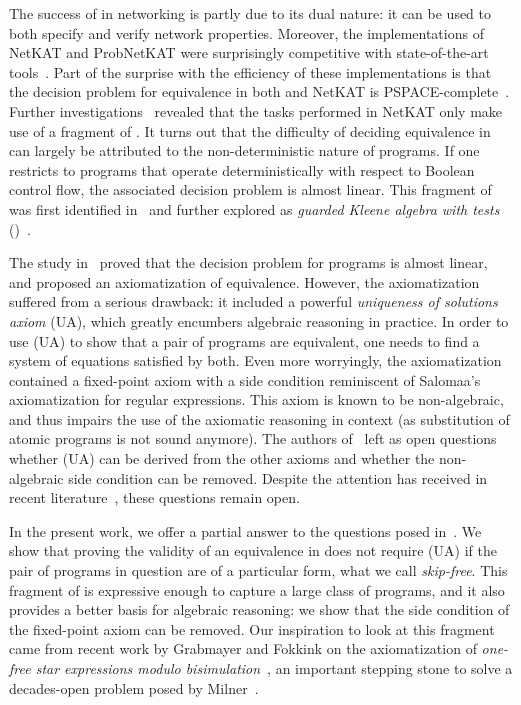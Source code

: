 \documentclass[orivec,envcountsect,envcountsame]{llncs}
\begin{document}
    The success of \KAT in networking is partly due to its dual nature: it can be used to both specify and verify network properties.
    Moreover, the implementations of {\sffamily NetKAT} and {\sffamily ProbNetKAT} were surprisingly competitive with state-of-the-art tools~\cite{netkat-decision,mcnetkat}.
    Part of the surprise with the efficiency of these implementations is that the decision problem for equivalence in both \KAT and {\sffamily NetKAT} is PSPACE-complete~\cite{katcompleteness,netkat}.
    Further investigations~\cite{gkatpopl} revealed that the tasks performed in {\sffamily NetKAT} only make use of a fragment of \KAT. %
    It turns out that the difficulty of deciding equivalence in \KAT can largely be attributed to the non-deterministic nature of \KAT programs.
    If one restricts to \KAT programs that operate deterministically with respect to Boolean control flow, the associated decision problem is almost linear.
    This fragment of \KAT was first identified in~\cite{kozentseng} and further explored as \emph{guarded Kleene algebra with tests} (\GKAT)~\cite{gkatpopl}.

    The study in~\cite{gkatpopl} proved that the decision problem for \GKAT programs is almost linear, and proposed an axiomatization of equivalence.
    However, the axiomatization suffered from a serious drawback: it included a powerful \emph{uniqueness of solutions axiom} (\textsf{UA}), which greatly encumbers algebraic reasoning in practice.
    In order to use (\textsf{UA}) to show that a pair of programs are equivalent, one needs to find a system of equations satisfied by both.
    Even more worryingly, the axiomatization contained a fixed-point axiom with a side condition reminiscent of Salomaa's axiomatization for regular expressions.
    This axiom is known to be non-algebraic, and thus impairs the use of the axiomatic reasoning in context (as substitution of atomic programs is not sound anymore).
    The authors of~\cite{gkatpopl} left as open questions whether (\textsf{UA}) can be derived from the other \GKAT axioms and whether the non-algebraic side condition can be removed.
    Despite the attention \GKAT has received in recent literature~\cite{gkaticalp,gkatlearning,processesparametrised}, these questions remain open.

    \smallskip
    In the present work, we offer a partial answer to the questions posed in~\cite{gkatpopl}.
    We show that proving the validity of an equivalence in \GKAT does not require (\textsf{UA}) if the pair of programs in question are of a particular form, what we call \emph{skip-free}.
    This fragment of \GKAT is expressive enough to capture a large class of programs, and it also provides a better basis for algebraic reasoning: we show that the side condition of the fixed-point axiom can be removed.
    Our inspiration to look at this fragment came from recent work by Grabmayer and Fokkink on the axiomatization of \emph{one-free star expressions modulo bisimulation}~\cite{onefreeregexlics,regexlics}, an important stepping stone to solve a decades-open problem posed by Milner~\cite{milner}.
\end{document}
